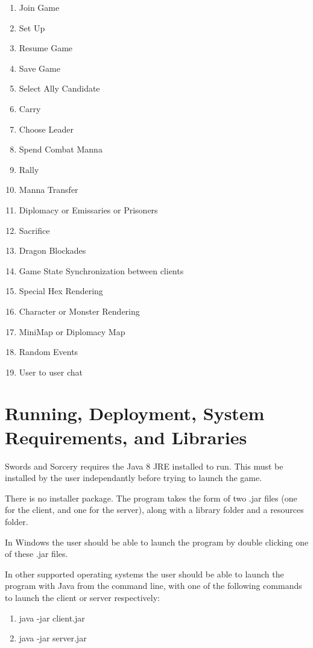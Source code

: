 \documentclass[12pt,a4paper]{article}
\begin{document}
\begin{enumerate}
\item{Join Game}
\item{Set Up}
\item{Resume Game}
\item{Save Game}
\item{Select Ally Candidate}
\item{Carry}
\item{Choose Leader}
\item{Spend Combat Manna}
\item{Rally}
\item{Manna Transfer}
\item{Diplomacy or Emissaries or Prisoners}
\item{Sacrifice}
\item{Dragon Blockades}
\item{Game State Synchronization between clients}
\item{Special Hex Rendering}
\item{Character or Monster Rendering}
\item{MiniMap or Diplomacy Map}
\item{Random Events}
\item{User to user chat}
\end{enumerate}

\section{Running, Deployment, System Requirements, and Libraries}
Swords and Sorcery requires the Java 8 JRE installed to run. This must be 
installed by the user independantly before trying to launch the game.

There is no installer package. The program takes the form of two .jar files
(one for the client, and one for the server), along with a library folder and a 
resources folder.

In Windows the user should be
able to launch the program by double clicking one of these .jar files. 

In other supported operating systems the user should be able to launch the
program with Java from the command line, with one of the following commands to
launch the client or server respectively:

\begin{enumerate}
\item{java -jar client.jar}
\item{java -jar server.jar}
\end{enumerate}
\end{document}
